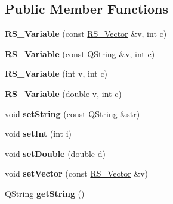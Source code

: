 \subsection*{Public Member Functions}
\begin{DoxyCompactItemize}
\item 
\hypertarget{classRS__Variable_afc278ebd26feece367a0b10819131113}{{\bfseries R\-S\-\_\-\-Variable} (const \hyperlink{classRS__Vector}{R\-S\-\_\-\-Vector} \&v, int c)}\label{classRS__Variable_afc278ebd26feece367a0b10819131113}

\item 
\hypertarget{classRS__Variable_aa8b73da8946db5f66213b5fba6a898ef}{{\bfseries R\-S\-\_\-\-Variable} (const Q\-String \&v, int c)}\label{classRS__Variable_aa8b73da8946db5f66213b5fba6a898ef}

\item 
\hypertarget{classRS__Variable_aea453be5d3a4e794f62797dc8cf0e58f}{{\bfseries R\-S\-\_\-\-Variable} (int v, int c)}\label{classRS__Variable_aea453be5d3a4e794f62797dc8cf0e58f}

\item 
\hypertarget{classRS__Variable_a184376aed26f0072259e915f77af7bc6}{{\bfseries R\-S\-\_\-\-Variable} (double v, int c)}\label{classRS__Variable_a184376aed26f0072259e915f77af7bc6}

\item 
\hypertarget{classRS__Variable_a5df558c2b9beba0d7d96221ac4801989}{void {\bfseries set\-String} (const Q\-String \&str)}\label{classRS__Variable_a5df558c2b9beba0d7d96221ac4801989}

\item 
\hypertarget{classRS__Variable_a05fd92dd8fbae2dadbcd255b7775d73c}{void {\bfseries set\-Int} (int i)}\label{classRS__Variable_a05fd92dd8fbae2dadbcd255b7775d73c}

\item 
\hypertarget{classRS__Variable_a5331cb2591d3fe4762fdf2879eb9396f}{void {\bfseries set\-Double} (double d)}\label{classRS__Variable_a5331cb2591d3fe4762fdf2879eb9396f}

\item 
\hypertarget{classRS__Variable_ad4c7d2c9ffc82e2df42374f2b8a701f0}{void {\bfseries set\-Vector} (const \hyperlink{classRS__Vector}{R\-S\-\_\-\-Vector} \&v)}\label{classRS__Variable_ad4c7d2c9ffc82e2df42374f2b8a701f0}

\item 
\hypertarget{classRS__Variable_ab00cfcac6b6c173a33c083a9a200f593}{Q\-String {\bfseries get\-String} ()}\label{classRS__Variable_ab00cfcac6b6c173a33c083a9a200f593}


\end{DoxyCompactItemize}
